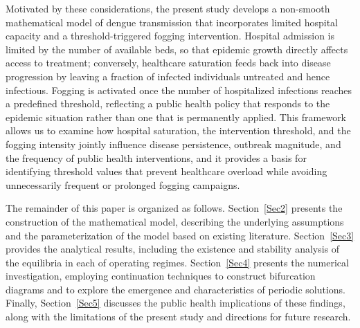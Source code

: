 \documentclass[preprint]{elsarticle}
\begin{document}
Motivated by these considerations, the present study develops a non-smooth mathematical model of dengue transmission that incorporates limited hospital capacity and a threshold-triggered fogging intervention. Hospital admission is limited by the number of available beds, so that epidemic growth directly affects access to treatment; conversely, healthcare saturation feeds back into disease progression by leaving a fraction of infected individuals untreated and hence infectious. Fogging is activated once the number of hospitalized infections reaches a predefined threshold, reflecting a public health policy that responds to the epidemic situation rather than one that is permanently applied. This framework allows us to examine how hospital saturation, the intervention threshold, and the fogging intensity jointly influence disease persistence, outbreak magnitude, and the frequency of public health interventions, and it provides a basis for identifying threshold values that prevent healthcare overload while avoiding unnecessarily frequent or prolonged fogging campaigns.

The remainder of this paper is organized as follows. Section~\ref{Sec2} presents the construction of the mathematical model, describing the underlying assumptions and the parameterization of the model based on existing literature. Section~\ref{Sec3} provides the analytical results, including the existence and stability analysis of the equilibria in each of operating regimes. Section~\ref{Sec4} presents the numerical investigation, employing continuation techniques to construct bifurcation diagrams and to explore the emergence and characteristics of periodic solutions. Finally, Section~\ref{Sec5} discusses the public health implications of these findings, along with the limitations of the present study and directions for future research.
\end{document}
